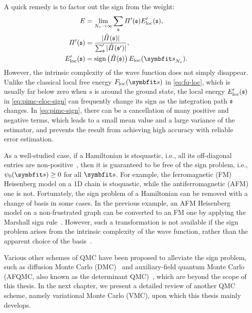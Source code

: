 A quick remedy is to factor out the sign from the weight:
\begin{align}
E &= \lim_{N_\tau \to \infty} \sum_\svs \varPi'(\svs) E'_\text{loc}(\svs), \label{eq:pimc-sign} \\
\varPi'(\svs) &= \frac{|\tilde{\varPi}(\svs)|}{\sum_\svs' |\tilde{\varPi}(\svs')|}, \\
E'_\text{loc}(\svs) &= \sign\left( \tilde{\varPi}(\svs) \right) E_\text{loc}(\vs_{N_\tau}). \label{eq:pimc-eloc-sign}
\end{align}
However, the intrinsic complexity of the wave function does not simply disappear. Unlike the classical local free energy $F_\text{loc}(\vs)$ in \cref{eq:fq-loc}, which is usually far below zero when $s$ is around the ground state, the local energy $E'_\text{loc}(\mathfrak{s})$ in \cref{eq:pimc-eloc-sign} can frequently change its sign as the integration path $\mathfrak{s}$ changes. In \cref{eq:pimc-sign}, there can be a cancellation of many positive and negative terms, which leads to a small mean value and a large variance of the estimator, and prevents the result from achieving high accuracy with reliable error estimation.

As a well-studied case, if a Hamiltonian is stoquastic, i.e., all its off-diagonal entries are non-positive~\cite{bravyi2008complexity}, then it is guaranteed to be free of the sign problem, i.e., $\psi_0(\vs) \ge 0$ for all $\vs$. For example, the ferromagnetic (FM) Heisenberg model on a 1D chain is stoquastic, while the antiferromagnetic (AFM) one is not. Fortunately, the sign problem of a Hamiltonian can be removed with a change of basis in some cases. In the previous example, an AFM Heisenberg model on a non-frustrated graph can be converted to an FM one by applying the Marshall sign rule~\cite{marshall1955antiferromagnetism}. However, such a transformation is not available if the sign problem arises from the intrinsic complexity of the wave function, rather than the apparent choice of the basis~\cite{troyer2005computational}.

Various other schemes of QMC have been proposed to alleviate the sign problem, such as diffusion Monte Carlo (DMC)~\cite{kalos1974helium, reynolds1982fixed, becca2017quantum10} and auxiliary-field quantum Monte Carlo (AFQMC, also known as the determinant QMC)~\cite{blankenbecler1981monte, zhang2003quantum}, which are beyond the scope of this thesis. In the next chapter, we present a detailed review of another QMC scheme, namely variational Monte Carlo (VMC), upon which this thesis mainly develops.

